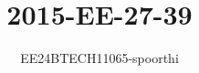 \documentclass[journal]{IEEEtran}
\begin{document}

\vspace{3cm}

\title{2015-EE-27-39}
\author{EE24BTECH11065-spoorthi
}
{\let\newpage\relax\maketitle}

\renewcommand{\thefigure}{\theenumi}
\renewcommand{\thetable}{\theenumi}
\setlength{\intextsep}{10pt} %


\renewcommand{\thetable}{\theenumi}
\end{document}
